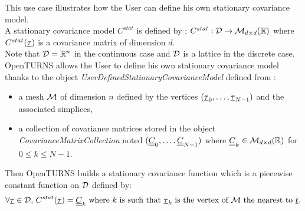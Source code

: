 \renewcommand{\filename}{docUC_StocProc_StationaryCovarianceFunction_UserDefined.tex}
\renewcommand{\filetitle}{UC : Creation of a  User defined stationary covariance function}

\HeaderIIILevel

\label{StationaryCovarianceModelCreation}

This use case illustrates how the User can define his own stationary covariance model.\\

A stationary covariance model $C^{stat}$ is defined by : $C^{stat}:  {\mathcal D} \rightarrow  \mathcal{M}_{d \times d}({\mathbb R})$ where  $C^{stat}({\underline{\tau}})$ is a covariance matrix of dimension $d$. \\
Note that ${\mathcal D}={\mathbb R}^n$ in the continuous case and ${\mathcal D}$ is a lattice in the discrete case.\\


OpenTURNS allows the User to define his own stationary covariance model thanks to the object {\itshape UserDefinedStationaryCovarianceModel} defined from :
\begin{itemize}
\item a mesh ${\mathcal M}$ of dimension $n$ defined by the vertices $({\underline{\tau}}_0,\dots, {\underline{\tau}}_{N-1})$ and the associated simplices,
\item a collection of covariance matrices stored in the object \emph{CovarianceMatrixCollection} noted $({\underline{\underline{C}}}_0, \dots, {\underline{\underline{C}}}_{N-1})$ where ${\underline{\underline{C}}}_k \in \mathcal{M}_{d \times d}({\mathbb R})$ for $0 \leq k \leq N-1$.
\end{itemize}
Then OpenTURNS builds a stationary covariance function which is a piecewise constant function on ${\mathcal D}$ defined by:
\begin{align*}
  \forall {\underline{\tau}} \in {\mathcal D}, \, C^{stat}({\underline{\tau}}) =  {\underline{\underline{C}}}_k \mbox{ where } k \mbox{ is such that } {\underline{\tau}}_k \mbox{ is the  vertex of } {\mathcal M}  \mbox{ the nearest to } {\underline{t}}.
\end{align*}


